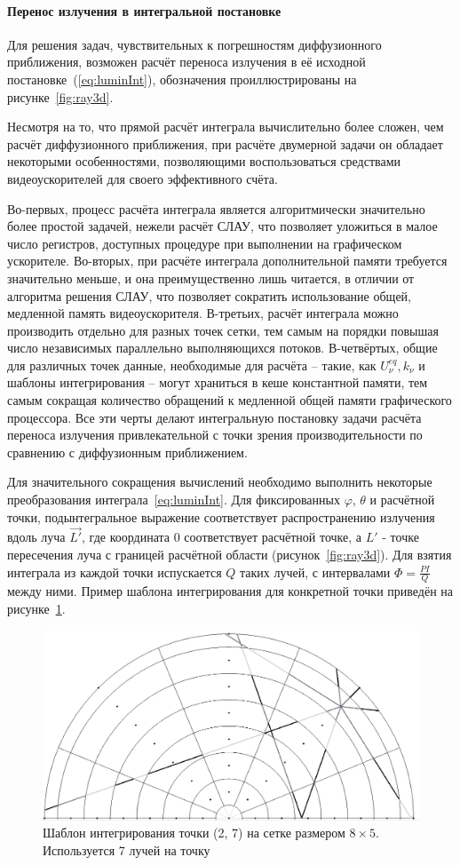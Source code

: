 \paragraph{Перенос излучения в интегральной постановке}\label{sec:intSolver}
Для решения задач, чувствительных к погрешностям диффузионного приближения, 
возможен расчёт переноса излучения в её исходной 
постановке~(\ref{eq:luminInt}), обозначения проиллюстрированы на 
рисунке~\ref{fig:ray3d}.

Несмотря на то, что прямой расчёт интеграла вычислительно более сложен, чем 
расчёт диффузионного приближения, при расчёте двумерной задачи он обладает 
некоторыми особенностями, позволяющими воспользоваться средствами 
видеоускорителей для своего эффективного счёта.

Во-первых, процесс расчёта интеграла является алгоритмически значительно более 
простой задачей, нежели расчёт СЛАУ, что позволяет уложиться в малое число 
регистров, доступных процедуре при выполнении на графическом ускорителе. 
Во-вторых, при расчёте интеграла дополнительной памяти требуется значительно 
меньше, и она преимущественно лишь читается, в отличии от алгоритма решения 
СЛАУ, что позволяет сократить использование общей, медленной память 
видеоускорителя. В-третьих, расчёт интеграла можно производить отдельно для 
разных точек сетки, тем самым на порядки повышая число независимых параллельно 
выполняющихся потоков. В-четвёртых, общие для различных точек данные, 
необходимые для расчёта -- такие, как $U_\nu^{eq}, k_\nu$ и шаблоны 
интегрирования -- могут храниться в кеше константной памяти, тем самым сокращая 
количество обращений к медленной общей памяти графического процессора. Все эти 
черты делают интегральную постановку задачи расчёта переноса излучения 
привлекательной с точки зрения производительности по сравнению с диффузионным 
приближением.

Для значительного сокращения вычислений необходимо выполнить некоторые 
преобразования интеграла~\eqref{eq:luminInt}. Для фиксированных $\varphi$, 
$\theta$ и расчётной точки, подынтегральное выражение соответствует 
распространению излучения вдоль луча $\vec{L'}$, где координата $0$ 
соответствует расчётной точке, а $L'$ - точке пересечения луча с границей 
расчётной области (рисунок~\ref{fig:ray3d}). Для взятия интеграла из каждой 
точки испускается $Q$ таких лучей, с интервалами $\Phi = \frac{PI}{Q}$ между 
ними. Пример шаблона интегрирования для конкретной точки приведён на 
рисунке~\ref{fig:intpattern}.

\begin{figure}
    \centering
    \includegraphics[width=.5\linewidth]{img/luminInt/intpattern}
    \caption{Шаблон интегрирования точки (2, 7) на сетке размером $8 \times 5$. 
    Используется 7 лучей на точку}
    \label{fig:intpattern}
\end{figure}

